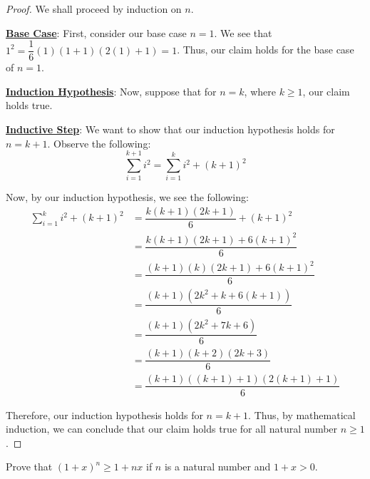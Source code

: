 \documentclass[openany]{book}
\let\oldsum\sum
\renewcommand{\sum}[2]{\oldsum\limits_{#1}^{#2}}
\begin{document}
\begin{proof}
	We shall proceed by induction on $n$.
	
	\textbf{\underline{Base Case}}: First, consider our base case $n=1$. We see that $1^{2}=\dfrac{1}{6}(1)(1+1)(2(1)+1)=1$. Thus, our claim holds for the base case of $n=1$.
	
	\underline{\textbf{Induction Hypothesis}}: Now, suppose that for $n=k$, where $k \geq 1$, our claim holds true.
	
	\underline{\textbf{Inductive Step}}: We want to show that our induction hypothesis holds for $n=k+1$. Observe the following:
	\begin{equation*}
		\sum{i=1}{k+1} i^{2} = \sum{i=1}{k} i^{2} + (k+1)^{2}
	\end{equation*}

	Now, by our induction hypothesis, we see the following:
	\begin{align*}
		\sum{i=1}{k} i^{2} + (k+1)^{2} &= \dfrac{k(k+1)(2k+1)}{6} + (k+1)^{2} \\
		&= \dfrac{k(k+1)(2k+1)+6(k+1)^{2}}{6} \\
		&= \dfrac{(k+1)(k)(2k+1)+6(k+1)^{2}}{6} \\
		&= \dfrac{(k+1)(2k^{2}+k+6(k+1))}{6} \\
		&= \dfrac{(k+1)(2k^{2}+7k+6)}{6} \\
		&= \dfrac{(k+1)(k+2)(2k+3)}{6} \\
		&= \dfrac{(k+1)((k+1)+1)(2(k+1)+1)}{6}
	\end{align*}

	Therefore, our induction hypothesis holds for $n=k+1$. Thus, by mathematical induction, we can conclude that our claim holds true for all natural number $n \geq 1$.
\end{proof}
\begin{hw}
	Prove that $(1+x)^{n} \geq 1+nx$ if $n$ is a natural number and $1+x > 0$.
\end{hw}
\end{document}
